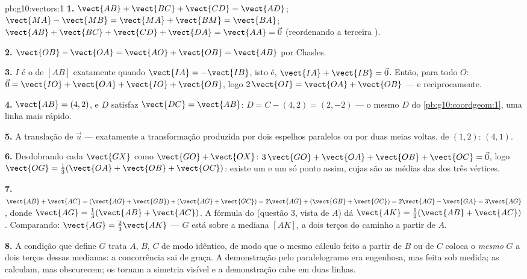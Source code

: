 \begin{solution}{pb:g10:vectors:1}
\textbf{1.} $\vect{AB} + \vect{BC} + \vect{CD} = \vect{AD}$;
\quad $\vect{MA} - \vect{MB} = \vect{MA} + \vect{BM} =
\vect{BA}$; \quad $\vect{AB} + \vect{BC} + \vect{CD} +
\vect{DA} = \vect{AA} = \vec 0$ (reordenando a terceira ).

\textbf{2.} $\vect{OB} - \vect{OA} = \vect{AO} + \vect{OB} =
\vect{AB}$ por Chasles.

\textbf{3.} $I$ é o  de $[AB]$ exatamente quando
$\vect{IA} = -\vect{IB}$, isto é,
$\vect{IA} + \vect{IB} = \vec 0$. Então, para todo $O$:
$\vec 0 = \vect{IO} + \vect{OA} + \vect{IO} + \vect{OB}$, logo
$2\,\vect{OI} = \vect{OA} + \vect{OB}$ --- e reciprocamente.

\textbf{4.} $\vect{AB} = (4, 2)$, e $D$ satisfaz
$\vect{DC} = \vect{AB}$: $D = C - (4, 2) = (2, -2)$ --- o mesmo
$D$ do \cref{pb:g10:coordgeom:1}, uma linha mais rápido.

\textbf{5.} A translação de  $\vec u$ --- exatamente a
transformação produzida por dois espelhos paralelos ou por duas
meias voltas.  de $(1, 2)$: $(4, 1)$.

\textbf{6.} Desdobrando cada $\vect{GX}$ como
$\vect{GO} + \vect{OX}$:
$3\,\vect{GO} + \vect{OA} + \vect{OB} + \vect{OC} = \vec 0$,
logo $\vect{OG} = \frac13(\vect{OA} + \vect{OB} + \vect{OC})$:
existe um e um só ponto assim, cujas  são as médias
das dos três vértices.

\textbf{7.} $\vect{AB} + \vect{AC} =
(\vect{AG} + \vect{GB}) + (\vect{AG} + \vect{GC})
= 2\vect{AG} + (\vect{GB} + \vect{GC})
= 2\vect{AG} - \vect{GA} = 3\vect{AG}$, donde
$\vect{AG} = \frac13(\vect{AB} + \vect{AC})$. A fórmula do
 (questão 3, vista de $A$) dá
$\vect{AK} = \frac12(\vect{AB} + \vect{AC})$. Comparando:
$\vect{AG} = \frac23\vect{AK}$ --- $G$ está sobre a mediana
$[AK]$, a dois terços do caminho a partir de $A$.

\textbf{8.} A condição que define $G$ trata $A$, $B$, $C$ de
modo idêntico, de modo que o mesmo cálculo feito a partir de
$B$ ou de $C$ coloca o \emph{mesmo} $G$ a dois terços dessas
medianas: a concorrência sai de graça. A demonstração pelo
paralelogramo era engenhosa, mas feita sob medida; as
 calculam, mas obscurecem; os  tornam a
simetria visível e a demonstração cabe em duas linhas.


\end{solution}

